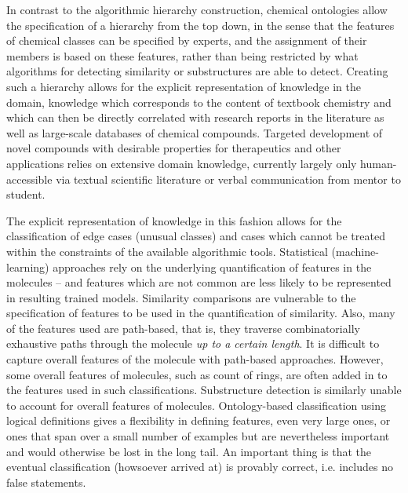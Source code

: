 \documentclass[10pt]{bmc_article}
\newenvironment{bmcformat}{\baselineskip20pt\sloppy\setboolean{publ}{false}}{\baselineskip20pt\sloppy}
\begin{document}
\begin{bmcformat}
In contrast to the algorithmic hierarchy construction, chemical ontologies allow the specification of a hierarchy from the top down, in the sense that the features of chemical classes can be specified by experts, and the assignment of their members is based on these features, rather than being restricted by what algorithms for detecting similarity or substructures are able to detect. Creating such a hierarchy allows for the explicit representation of knowledge in the domain, knowledge which corresponds to the content of textbook chemistry and which can then be directly correlated with research reports in the literature as well as large-scale databases of chemical compounds. Targeted development of novel compounds with desirable properties for therapeutics and other applications relies on extensive domain knowledge, currently largely only human-accessible via textual scientific literature or verbal communication from mentor to student. 

The explicit representation of knowledge in this fashion allows for the classification of edge cases (unusual classes)
 and cases which cannot be treated within the constraints of the available algorithmic tools. %
 Statistical (machine-learning) approaches rely on the underlying quantification of features in the molecules -- and features which are not common are less likely %
 to be represented in resulting trained models. Similarity comparisons are vulnerable to the specification of features to be used in the quantification of similarity.  
Also, many of the features used are path-based, that is, they traverse combinatorially exhaustive paths through the molecule \textit{up to a certain length}.  It is difficult to capture overall features of the molecule with path-based approaches.  However, some overall features of molecules, such as count of rings, are often added in to the features used in such classifications. Substructure detection is similarly unable to account for overall features of molecules.  %
Ontology-based classification using logical definitions gives a flexibility in defining features, even very large ones, or ones that span over a small number of examples but are nevertheless important and would otherwise be lost in the long tail.  An important thing is that the eventual classification (howsoever arrived at) is provably correct, i.e. includes no false statements. 


\end{bmcformat}
\end{document}
